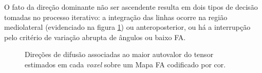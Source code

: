 \documentclass[
    12pt,                %
    oneside,            %
    a4paper,            %
    english,            %
    french,                %
    spanish,            %
    brazil                %
    ]{abntex2}
\begin{document}
O fato da direção dominante não ser ascendente resulta em dois tipos de decisão tomadas no processo iterativo: a integração das linhas ocorre na região mediolateral (evidenciado na figura \ref{fig::FA_coronal_Linhas1DTI}) ou anteroposterior, ou há a interrupção pelo critério de variação abrupta de ângulos ou baixo FA.

\begin{figure}[ht]
\centering
\captionsetup[subfloat]{farskip=5pt,nearskip=0pt}



    \linebreak
    \hfill
    \caption{Direções de difusão associadas ao maior autovalor do tensor estimados em cada \textit{voxel} sobre um Mapa FA codificado por cor.}
    \label{fig::FA_coronal_Linhas1DTI}
\end{figure}
\end{document}
